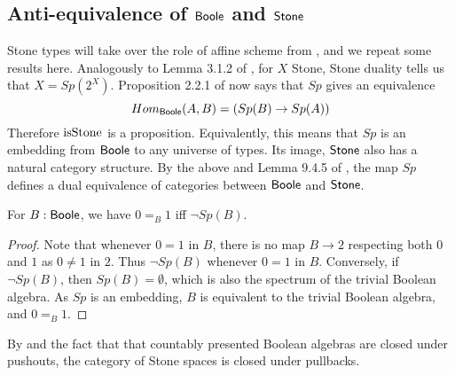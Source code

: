 \subsection{Anti-equivalence of $\mathsf{Boole}$ and $\mathsf{Stone}$}

\begin{remark}\label{SpIsAntiEquivalence}
Stone types will take over the role of affine scheme from \cite{draft}, 
and we repeat some results here. 
Analogously to Lemma 3.1.2 of \cite{draft}, 
for $X$ Stone, Stone duality tells us that $X = Sp(2^X)$. 
%
Proposition 2.2.1 of \cite{draft} now says that 
$Sp$ gives an equivalence 
\begin{equation}
   Hom_{\mathsf{Boole}} (A, B) = (Sp(B) \to Sp(A))
\end{equation}
Therefore $\mathrm{isStone}$ is a proposition.
Equivalently, 
this means that 
$Sp$ is an embedding from $\mathsf{Boole}$ to any universe of types.
Its image, $\mathsf{Stone}$ also has a natural category structure.
By the above and Lemma 9.4.5 of \cite{hott}, 
the map $Sp$ defines a dual equivalence of categories between $\mathsf{Boole}$ and $\mathsf{Stone}$.
\end{remark}

\begin{lemma}\label{SpectrumEmptyIff01Equal}
  For $B:\mathsf{Boole}$, we have $0=_B1$ iff $\neg Sp(B)$.
\end{lemma}
\begin{proof}
  Note that whenever $0=1$ in $B$, there is no map $B\to 2$ respecting both $0$ and $1$ as $0\neq 1$ in $2$. 
  Thus $\neg Sp(B)$ whenever $0=1$ in $B$. 
  Conversely, if $\neg Sp(B)$, then $Sp(B) = \emptyset$, which is also the spectrum of the trivial Boolean algebra. 
  As $Sp$ is an embedding, $B$ is equivalent to the trivial Boolean algebra, and $0=_B1$. 
\end{proof}


\begin{remark}\label{StoneClosedUnderPullback}
  By  and the fact that that countably presented Boolean algebras are closed under pushouts, 
  the category of Stone spaces is closed under pullbacks. 
\end{remark}

